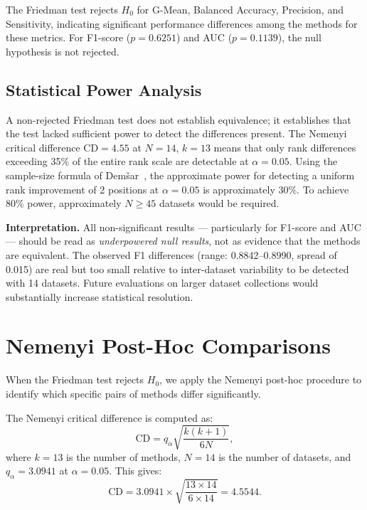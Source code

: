 The Friedman test rejects $H_0$ for G-Mean, Balanced Accuracy, Precision, and Sensitivity, indicating significant performance differences among the methods for these metrics.
For F1-score ($p = 0.6251$) and AUC ($p = 0.1139$), the null hypothesis is not rejected.

\subsection{Statistical Power Analysis}
\label{sec:stat:power}

A non-rejected Friedman test does not establish equivalence; it establishes that the test lacked sufficient power to detect the differences present.
The Nemenyi critical difference $\mathrm{CD} = 4.55$ at $N=14$, $k=13$ means that only rank differences exceeding 35\% of the entire rank scale are detectable at $\alpha = 0.05$.
Using the sample-size formula of Dem\v{s}ar~\cite{demsar2006statistical}, the approximate power for detecting a uniform rank improvement of 2 positions at $\alpha = 0.05$ is approximately 30\%.
To achieve 80\% power, approximately $N \geq 45$ datasets would be required.

\textbf{Interpretation.}
All non-significant results — particularly for F1-score and AUC — should be read as \emph{underpowered null results}, not as evidence that the methods are equivalent.
The observed F1 differences (range: 0.8842--0.8990, spread of 0.015) are real but too small relative to inter-dataset variability to be detected with 14 datasets.
Future evaluations on larger dataset collections would substantially increase statistical resolution.


\section{Nemenyi Post-Hoc Comparisons}
\label{sec:stat:holm}

When the Friedman test rejects $H_0$, we apply the Nemenyi post-hoc procedure to identify which specific pairs of methods differ significantly.

The Nemenyi critical difference is computed as:
\begin{equation}
    \mathrm{CD} = q_\alpha \sqrt{\frac{k(k+1)}{6N}},
\end{equation}
where $k = 13$ is the number of methods, $N = 14$ is the number of datasets, and $q_\alpha = 3.0941$ at $\alpha = 0.05$.
This gives:
\begin{equation}
    \mathrm{CD} = 3.0941 \times \sqrt{\frac{13 \times 14}{6 \times 14}} = 4.5544.
\end{equation}

